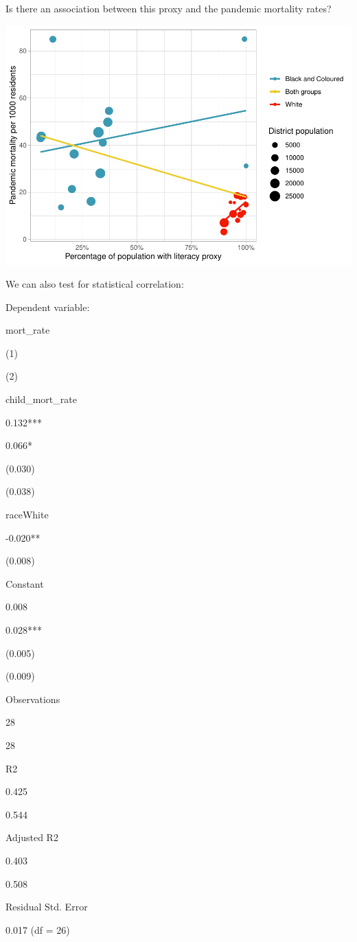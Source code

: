 \documentclass[fleqn,10pt,lineno]{wlpeerj} %
\begin{document}
Is there an association between this proxy and the pandemic mortality rates?

\includegraphics{spanish-flu-mortality_bookdown_files/figure-latex/unnamed-chunk-21-1.pdf}

We can also test for statistical correlation:

Dependent variable:

mort\_rate

(1)

(2)

child\_mort\_rate

0.132***

0.066*

(0.030)

(0.038)

raceWhite

-0.020**

(0.008)

Constant

0.008

0.028***

(0.005)

(0.009)

Observations

28

28

R2

0.425

0.544

Adjusted R2

0.403

0.508

Residual Std. Error

0.017 (df = 26)
\end{document}
